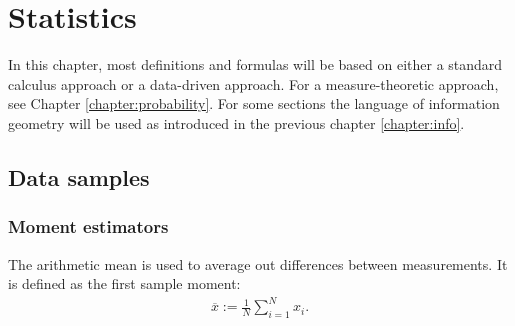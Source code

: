 \chapter{Statistics}\label{chapter:statistics}

    In this chapter, most definitions and formulas will be based on either a standard calculus approach or a data-driven approach. For a measure-theoretic approach, see Chapter \ref{chapter:probability}. For some sections the language of information geometry will be used as introduced in the previous chapter \ref{chapter:info}.

\section{Data samples}
\subsection{Moment estimators}

    \begin{example}\label{statistics:arithmetic_mean}
        The arithmetic mean is used to average out differences between measurements. It is defined as the first sample moment:
        \begin{gather}
            \overline{x} := \frac{1}{N}\sum_{i=1}^Nx_i.
        \end{gather}
    \end{example}

